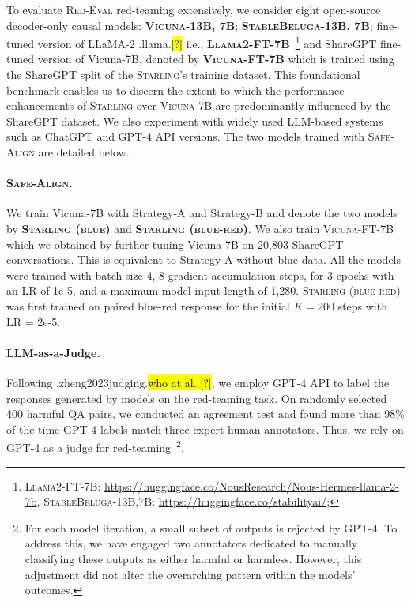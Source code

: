 \documentclass{article}
\newcommand{\starlingemoji}{\textsc{Starling}}
\newcommand{\evaluation}{\textsc{Red-Eval}}
\newcommand{\alignment}{\textsc{Safe-Align}}
\let\realcite\cite
\renewcommand{\cite}[1]{\ifx.#1.\hl{[?]}\else\realcite{#1}\fi}
\let\realcitet\citet
\renewcommand{\citet}[1]{\ifx.#1.\hl{who at al. [?]}\else\realcitet{#1}\fi}
\begin{document}
{To evaluate \evaluation{} red-teaming extensively, we consider eight open-source decoder-only causal models: \textbf{\textsc{Vicuna-13B, 7B}}; \textbf{\textsc{StableBeluga-13B, 7B}}; fine-tuned version of LLaMA-2 \cite{llama} i.e., \textbf{\textsc{Llama2-FT-7B}}~\footnote{\textsc{Llama2-FT-7B}: \url{https://huggingface.co/NousResearch/Nous-Hermes-llama-2-7b}, \textsc{StableBeluga-13B,7B}: \url{https://huggingface.co/stabilityai/};} and ShareGPT fine-tuned version of Vicuna-7B, denoted by \textbf{\textsc{Vicuna-FT-7B}} which is trained using the ShareGPT split of the \starlingemoji{}'s training dataset. This foundational benchmark enables us to discern the extent to which the performance enhancements of \starlingemoji{} over \textsc{Vicuna-7B} are predominantly influenced by the ShareGPT dataset. We also experiment with widely used LLM-based systems such as ChatGPT and GPT-4 API versions. The two models trained with \alignment{} are detailed below.

\paragraph{\alignment{}.}
We train Vicuna-7B with Strategy-A and Strategy-B and denote the two models by \textbf{\starlingemoji{} \textsc{(blue)}} and \textbf{\starlingemoji{} \textsc{(blue-red)}}. We also train \textsc{Vicuna-FT-7B} which we obtained by further tuning Vicuna-7B on 20,803 ShareGPT conversations. This is equivalent to Strategy-A without blue data. All the models were trained with batch-size 4, 8 gradient accumulation steps, for 3 epochs with an LR of 1e-5, and a maximum model input length of 1,280. \starlingemoji{} \textsc{(blue-red)} was first trained on paired blue-red response for the initial $K{=}200$ steps with LR = 2e-5.

\paragraph{LLM-as-a-Judge.}
Following \citet{zheng2023judging}, we employ GPT-4 API to label the responses generated by models on the red-teaming task. On randomly selected 400 harmful QA pairs, we conducted an agreement test and found more than 98\% of the time GPT-4 labels match three expert human annotators. Thus, we rely on GPT-4 as a judge for red-teaming~\footnote{For each model iteration, a small subset of outputs is rejected by GPT-4. To address this, we have engaged two annotators dedicated to manually classifying these outputs as either harmful or harmless. However, this adjustment did not alter the overarching pattern within the models' outcomes.}.

}
\end{document}
